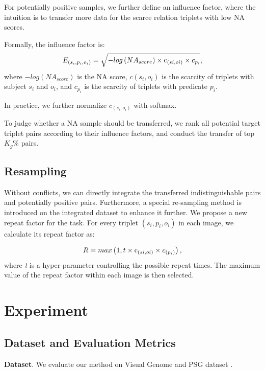 \documentclass[letterpaper]{article} %
\begin{document}
For potentially positive samples, we further define an influence factor, where the intuition is to transfer more data for the scarce relation triplets with low NA scores.

Formally, the influence factor is:
\begin{equation}
{E}_{\left(s_i,p_i,o_i\right)}=\sqrt{-log\left({NA}_{score}\right)\times{\rm c}_{\left(si,oi\right)}\times{c}_{p_i}},
\end{equation}
where $-log(NA_{score})$ is the NA score, $c(s_i, o_i)$ is the scarcity of triplets with subject $s_i$ and $o_i$, and $ c_{p_i} $ is the scarcity of triplets with predicate $ p_i $.



In practice, we further normalize $c_{(s_i, o_i)}$ with softmax.

To judge whether a NA sample should be transferred, we rank all potential target triplet pairs according to their influence factors, and conduct the transfer of top $K_g\%$ pairs.


\subsection{Resampling}
\label{Re}
Without conflicts, we can directly integrate the transferred indistinguishable pairs and potentially positive pairs. Furthermore, a special re-sampling method is introduced on the integrated dataset to enhance it further.
We propose a new repeat factor for the task. For every triplet $(s_i,p_i,o_i)$ in each image, we calculate its repeat factor as:

\begin{equation}
{R}=max\left(1,t\times{\rm c}_{\left(si,oi\right)}\times{c}_{\left(p_i\right)}\right),
\end{equation}
where \textit{t} is a hyper-parameter controlling the possible repeat times. The maximum value of the repeat factor within each image is then selected.



\section{Experiment}

\subsection{Dataset and Evaluation Metrics}
\noindent\textbf{Dataset}. We evaluate our method on Visual Genome \cite{Krishna2017} and PSG dataset \cite{yang2022psg}.
\end{document}
